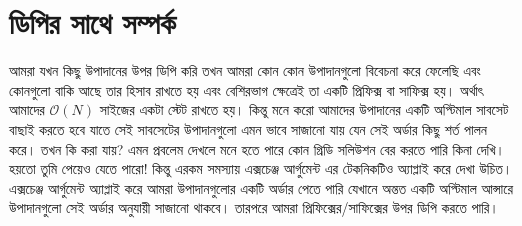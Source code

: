 \section{ডিপির সাথে সম্পর্ক}

আমরা যখন কিছু উপাদানের উপর ডিপি করি তখন আমরা কোন কোন উপাদানগুলো বিবেচনা করে ফেলেছি এবং কোনগুলো বাকি আছে তার হিসাব রাখতে হয় এবং বেশিরভাগ ক্ষেত্রেই তা একটি প্রিফিক্স বা সাফিক্স হয়। অর্থাৎ আমাদের $\mathcal{O}(N)$ সাইজের একটা স্টেট রাখতে হয়। কিন্তু মনে করো আমাদের উপাদানের একটি অপ্টিমাল সাবসেট বাছাই করতে হবে যাতে সেই সাবসেটের উপাদানগুলো এমন ভাবে সাজানো যায় যেন সেই অর্ডার কিছু শর্ত পালন করে। তখন কি করা যায়? এমন প্রবলেম দেখলে মনে হতে পারে কোন গ্রিডি সলিউশন বের করতে পারি কিনা দেখি। হয়তো তুমি পেয়েও যেতে পারো! কিন্তু এরকম সমস্যায় এক্সচেঞ্জ আর্গুমেন্ট এর টেকনিকটিও অ্যাপ্লাই করে দেখা উচিত। এক্সচেঞ্জ আর্গুমেন্ট অ্যাপ্লাই করে আমরা উপাদানগুলোর একটি অর্ডার পেতে পারি যেখানে অন্তত একটি অপ্টিমাল আন্সারে উপাদানগুলো সেই অর্ডার অনুযায়ী সাজানো থাকবে। তারপরে আমরা প্রিফিক্সের/সাফিক্সের উপর ডিপি করতে পারি।

